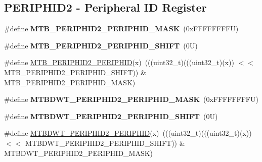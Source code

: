 \subsection*{P\+E\+R\+I\+P\+H\+I\+D2 -\/ Peripheral ID Register}
\begin{DoxyCompactItemize}
\item 
\mbox{\label{group___m_t_b___register___masks_ga02096ce6af0ca5e1b993ab869d8d33eb}} 
\#define {\bfseries M\+T\+B\+\_\+\+P\+E\+R\+I\+P\+H\+I\+D2\+\_\+\+P\+E\+R\+I\+P\+H\+I\+D\+\_\+\+M\+A\+SK}~(0x\+F\+F\+F\+F\+F\+F\+F\+F\+U)
\item 
\mbox{\label{group___m_t_b___register___masks_ga7723f40ee0982cda1579ae42a95a461f}} 
\#define {\bfseries M\+T\+B\+\_\+\+P\+E\+R\+I\+P\+H\+I\+D2\+\_\+\+P\+E\+R\+I\+P\+H\+I\+D\+\_\+\+S\+H\+I\+FT}~(0\+U)
\item 
\#define \mbox{\hyperlink{group___m_t_b___register___masks_ga816cba461fce60910be7d77f1cf0a48f}{M\+T\+B\+\_\+\+P\+E\+R\+I\+P\+H\+I\+D2\+\_\+\+P\+E\+R\+I\+P\+H\+ID}}(x)~(((uint32\+\_\+t)(((uint32\+\_\+t)(x)) $<$$<$ M\+T\+B\+\_\+\+P\+E\+R\+I\+P\+H\+I\+D2\+\_\+\+P\+E\+R\+I\+P\+H\+I\+D\+\_\+\+S\+H\+I\+FT)) \& M\+T\+B\+\_\+\+P\+E\+R\+I\+P\+H\+I\+D2\+\_\+\+P\+E\+R\+I\+P\+H\+I\+D\+\_\+\+M\+A\+SK)
\item 
\mbox{\label{group___m_t_b___register___masks_ga7ff745cf5423b3e1a720239ec421175f}} 
\#define {\bfseries M\+T\+B\+D\+W\+T\+\_\+\+P\+E\+R\+I\+P\+H\+I\+D2\+\_\+\+P\+E\+R\+I\+P\+H\+I\+D\+\_\+\+M\+A\+SK}~(0x\+F\+F\+F\+F\+F\+F\+F\+F\+U)
\item 
\mbox{\label{group___m_t_b___register___masks_ga77e08c5a187edc60cbafbd3bcd99003f}} 
\#define {\bfseries M\+T\+B\+D\+W\+T\+\_\+\+P\+E\+R\+I\+P\+H\+I\+D2\+\_\+\+P\+E\+R\+I\+P\+H\+I\+D\+\_\+\+S\+H\+I\+FT}~(0\+U)
\item 
\#define \mbox{\hyperlink{group___m_t_b___register___masks_ga038c0bcc02aa1185f73a7be90dfe8249}{M\+T\+B\+D\+W\+T\+\_\+\+P\+E\+R\+I\+P\+H\+I\+D2\+\_\+\+P\+E\+R\+I\+P\+H\+ID}}(x)~(((uint32\+\_\+t)(((uint32\+\_\+t)(x)) $<$$<$ M\+T\+B\+D\+W\+T\+\_\+\+P\+E\+R\+I\+P\+H\+I\+D2\+\_\+\+P\+E\+R\+I\+P\+H\+I\+D\+\_\+\+S\+H\+I\+FT)) \& M\+T\+B\+D\+W\+T\+\_\+\+P\+E\+R\+I\+P\+H\+I\+D2\+\_\+\+P\+E\+R\+I\+P\+H\+I\+D\+\_\+\+M\+A\+SK)
\item 

\end{DoxyCompactItemize}

